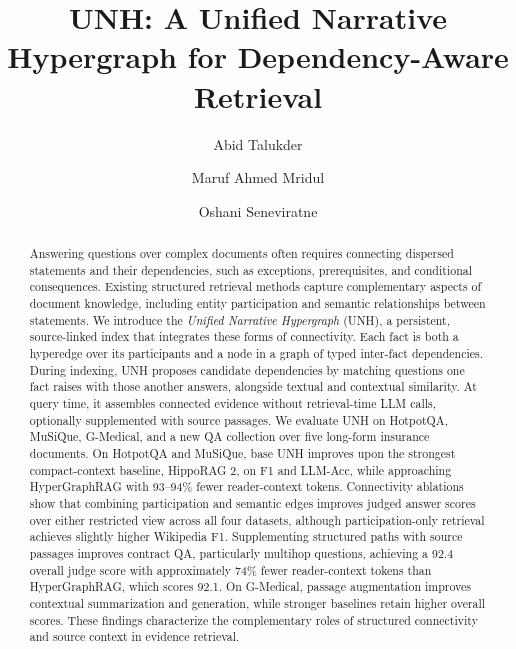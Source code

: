 \documentclass[sigconf, review, anonymous]{acmart}
\newcommand{\sys}{UNH}
\newcommand{\sysfull}{Unified Narrative Hypergraph}
\begin{document}
\title{UNH: A Unified Narrative Hypergraph for Dependency-Aware Retrieval}

\author{Abid Talukder}

\author{Maruf Ahmed Mridul}

\author{Oshani Seneviratne}

\renewcommand{\shortauthors}{Talukder et al.}


\begin{abstract}
Answering questions over complex documents often requires
connecting dispersed statements and their dependencies,
such as exceptions, prerequisites, and conditional
consequences. Existing structured retrieval methods
capture complementary aspects of document knowledge,
including entity participation and semantic relationships
between statements. We introduce the \emph{\sysfull} (\sys{}), a persistent, source-linked index that
integrates these forms of connectivity. Each fact is both
a hyperedge over its participants and a node in a graph
of typed inter-fact dependencies. During indexing, UNH
proposes candidate dependencies by matching questions
one fact raises with those another answers, alongside
textual and contextual similarity. At query time, it
assembles connected evidence without retrieval-time
LLM calls, optionally supplemented with source passages.
We evaluate UNH on HotpotQA, MuSiQue, G-Medical, and a
new QA collection over five long-form insurance documents.
On HotpotQA and MuSiQue, base UNH improves upon the
strongest compact-context baseline, HippoRAG 2, on F1
and LLM-Acc, while approaching HyperGraphRAG with
93--94\% fewer reader-context tokens. Connectivity
ablations show that combining participation and semantic
edges improves judged answer scores over either
restricted view across all four datasets, although
participation-only retrieval achieves slightly higher
Wikipedia F1. Supplementing structured paths with
source passages improves contract QA, particularly
multihop questions, achieving a 92.4 overall judge score
with approximately 74\% fewer reader-context tokens
than HyperGraphRAG, which scores 92.1. On G-Medical,
passage augmentation improves contextual summarization
and generation, while stronger baselines retain higher
overall scores. These findings characterize the
complementary roles of structured connectivity and
source context in evidence retrieval.
\end{abstract}
\end{document}
